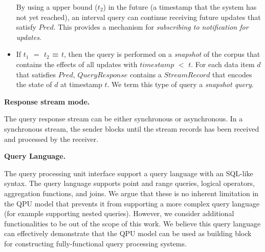 \begin{itemize}
  By using a upper bound ($t_2$) in the future (a timestamp that the system has not yet reached),
  an interval query can continue receiving future updates that satisfy $Pred$.
  This provides a mechanism for \textit{subscribing to notification for updates}.

  \item If \textbf{$t_1$ $=$ $t_2$ = $t$},
  then the query is performed on a \textit{snapshot} of the corpus that contains the effects of all updates with
  $timestamp$ $<$ $t$.
  For each data item $d$ that satisfies $Pred$, $QueryResponse$ contains a $StreamRecord$ that encodes the state of $d$
  at timestamp $t$.
  We term this type of query a \textit{snapshot query}.

\end{itemize}



\medskip
\noindent
\textbf{Response stream mode.}

\noindent
The query response stream can be either synchronous or asynchronous.
In a synchronous stream, the sender blocks until the stream records has been received and processed by the receiver.

\medskip
\noindent
\textbf{Query Language.}

\noindent
The query processing unit interface support a query language with an SQL-like syntax.
The query language supports point and range queries, logical operators, aggregation functions, and joins.
We argue that these is no inherent limitation in the QPU model that prevents it from supporting a more complex
query language (for example supporting nested queries).
However, we consider additional functionalities to be out of the scope of this work.
We believe this query language can effectively demonstrate that the QPU model can be used as building
block for constructing fully-functional query processing systems.

